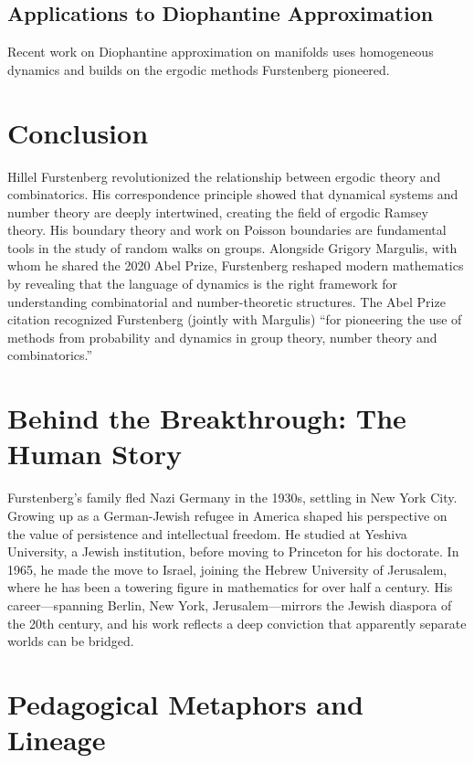 \subsection{Applications to Diophantine Approximation}

Recent work on Diophantine approximation on manifolds uses homogeneous dynamics and builds on the ergodic methods Furstenberg pioneered.

\section{Conclusion}

Hillel Furstenberg revolutionized the relationship between ergodic theory and combinatorics. His correspondence principle showed that dynamical systems and number theory are deeply intertwined, creating the field of ergodic Ramsey theory. His boundary theory and work on Poisson boundaries are fundamental tools in the study of random walks on groups. Alongside Grigory Margulis, with whom he shared the 2020 Abel Prize, Furstenberg reshaped modern mathematics by revealing that the language of dynamics is the right framework for understanding combinatorial and number-theoretic structures. The Abel Prize citation recognized Furstenberg (jointly with Margulis) ``for pioneering the use of methods from probability and dynamics in group theory, number theory and combinatorics.''

\section{Behind the Breakthrough: The Human Story}

Furstenberg's family fled Nazi Germany in the 1930s, settling in New York City. Growing up as a German-Jewish refugee in America shaped his perspective on the value of persistence and intellectual freedom. He studied at Yeshiva University, a Jewish institution, before moving to Princeton for his doctorate. In 1965, he made the move to Israel, joining the Hebrew University of Jerusalem, where he has been a towering figure in mathematics for over half a century. His career---spanning Berlin, New York, Jerusalem---mirrors the Jewish diaspora of the 20th century, and his work reflects a deep conviction that apparently separate worlds can be bridged.

\section{Pedagogical Metaphors and Lineage}
